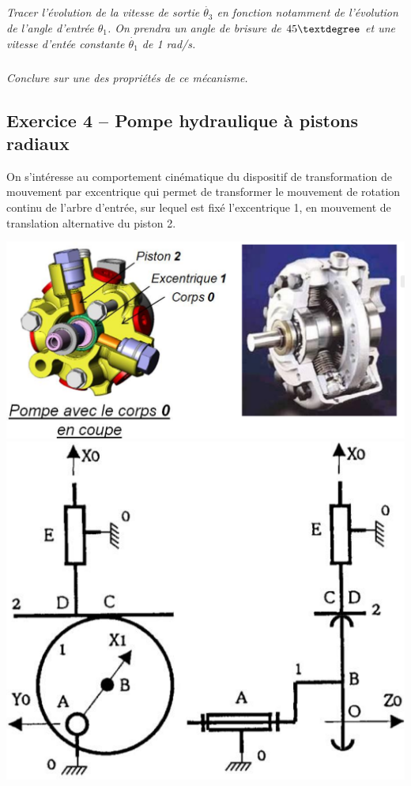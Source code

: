 \documentclass[10pt,fleqn]{article} %
\begin{document}
\begin{multicols}{2}
\subparagraph{}
\textit{Tracer l’évolution de la vitesse de sortie $\dot{\theta_3}$ en fonction notamment de l’évolution de l’angle d’entrée $\theta_1$. On prendra un angle de brisure de $45\textdegree$ et une vitesse d’entée constante $\dot{\theta_1}$ de 1 rad/s.}
\ifprof
\begin{corrige}
\end{corrige}
\else \fi

\subparagraph{}
\textit{Conclure sur une des propriétés de ce mécanisme.}
\ifprof
\begin{corrige}
\end{corrige}
\else \fi


\newpage
\subsection*{Exercice 4 -- Pompe hydraulique à pistons radiaux}
 \setcounter{exo}{0}
On s’intéresse au comportement cinématique du dispositif de transformation de mouvement par excentrique 
qui permet de transformer le mouvement de rotation continu de l’arbre d’entrée, sur lequel est fixé 
l’excentrique 1, en mouvement de translation alternative du piston 2. 

\begin{center}
\includegraphics[width=\linewidth]{images/fig1} 
\includegraphics[width=\linewidth]{images/fig2} 
\end{center}





\end{multicols}
\end{document}
